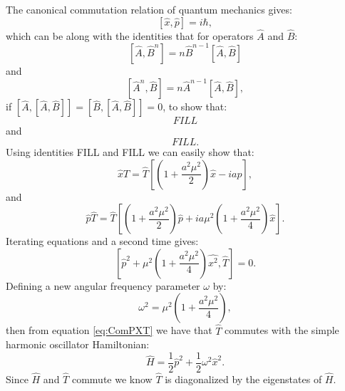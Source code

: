 \documentclass[12pt]{article}
\begin{document}
The canonical commutation relation of quantum mechanics gives:
\begin{equation}
	\label{eq:QMCCM}
	\left[\hat{x},\hat{p}\right] = i\hbar,
\end{equation}
which can be  along with the identities that for operators $\hat{A}$ and $\hat{B}$:
\begin{equation}
	\label{eq:ComutationNIdentity1}
	\left[\hat{A},\hat{B}^n\right] = n\hat{B}^{n-1}\left[\hat{A},\hat{B}\right]
\end{equation}
and
\begin{equation}
	\label{eq:ComutationNIdentity2}
	\left[\hat{A}^n,\hat{B}\right] = n\hat{A}^{n-1}\left[\hat{A},\hat{B}\right],
\end{equation}
if $\left[\hat{A},\left[\hat{A},\hat{B}\right]\right] = \left[\hat{B},\left[\hat{A},\hat{B}\right]\right] = 0 $, to show that:
\begin{equation}
	FILL
\end{equation}
and
\begin{equation}
	FILL.
\end{equation}
Using identities FILL and FILL we can easily show that:
\begin{equation}
	\label{eq:XT}
	\hat{x}\hat{T} = \hat{T}\left[\left(1+\frac{a^2\mu^2}{2}\right)\hat{x} - ia\hat{p}\right],
\end{equation}
and
\begin{equation}
	\label{eq:PT}
	\hat{p}\hat{T} = \hat{T}\left[\left(1+\frac{a^2\mu^2}{2}\right)\hat{p}+ia\mu^2\left(1+\frac{a^2\mu^2}{4}\right)\hat{x}\right].
\end{equation}
Iterating equations \label{eq:XT} and \label{eq:PT} a second time gives:
\begin{equation}
	\label{eq:ComPXT}
	\left[\hat{p}^2+\mu^2\left(1+\frac{a^2\mu^2}{4}\right)\hat{x^2},\hat{T}\right] = 0.
\end{equation}
Defining a new angular frequency parameter $\omega$ by:
\begin{equation}
	\label{eq:omega}
	\omega^2 = \mu^2\left(1+\frac{a^2\mu^2}{4}\right),
\end{equation}
then from equation \ref{eq:ComPXT} we have that $\hat{T}$ commutes with the simple harmonic oscillator Hamiltonian:
\begin{equation}
	\label{eq:OmegaHamiltonian}
	\hat{H} = \frac{1}{2}\hat{p}^2+\frac{1}{2}\omega^2\hat{x}^2.
\end{equation}
Since $\hat{H}$ and $\hat{T}$ commute we know $\hat{T}$ is diagonalized by the eigenstates of $\hat{H}$. 
\end{document}
